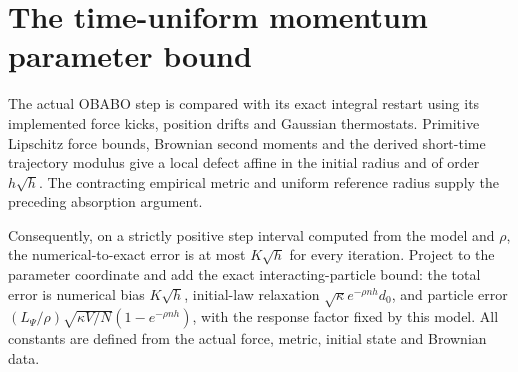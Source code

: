 \documentclass[11pt,a4paper]{report}
\begin{document}
\section{\texorpdfstring{The time-uniform momentum parameter bound}{The time-uniform momentum parameter bound}}


The actual OBABO step is compared with its exact integral restart using its implemented force kicks, position drifts and Gaussian thermostats. Primitive Lipschitz force bounds, Brownian second moments and the derived short-time trajectory modulus give a local defect affine in the initial radius and of order \(h\sqrt h\). The contracting empirical metric and uniform reference radius supply the preceding absorption argument.



Consequently, on a strictly positive step interval computed from the model and \(\rho\), the numerical-to-exact error is at most \(K\sqrt h\) for every iteration. Project to the parameter coordinate and add the exact interacting-particle bound: the total error is numerical bias \(K\sqrt h\), initial-law relaxation \(\sqrt\kappa e^{-\rho nh}d_0\), and particle error \((L_\Psi/\rho)\sqrt{\kappa V/N}(1-e^{-\rho nh})\), with the response factor fixed by this model. All constants are defined from the actual force, metric, initial state and Brownian data.
\end{document}
